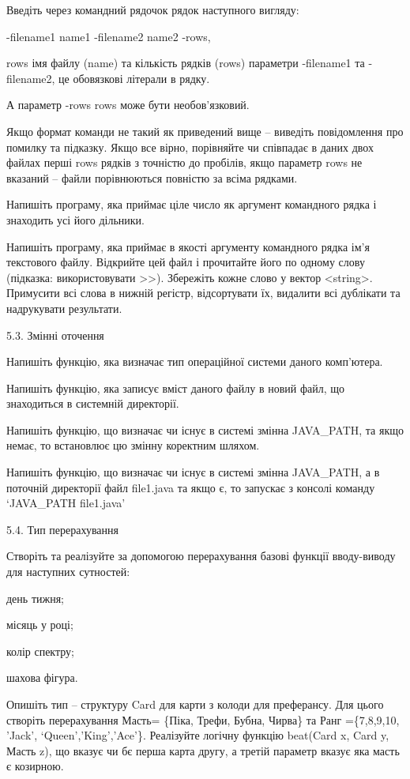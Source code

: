\documentclass[]{article}
\begin{document}
Введіть через командний рядочок рядок наступного вигляду:

-filename1 name1 -filename2 name2 -rows,

rows імя файлу (name) та кількість рядків (rows) параметри -filename1 та
-filename2, це обовязкові літерали в рядку.

А параметр -rows rows може бути необов'язковий.

Якщо формат команди не такий як приведений вище -- виведіть повідомлення
про помилку та підказку. Якщо все вірно, порівняйте чи співпадає в даних
двох файлах перші rows рядків з точністю до пробілів, якщо параметр rows
не вказаний -- файли порівнюються повністю за всіма рядками.

Напишіть програму, яка приймає ціле число як аргумент командного рядка і
знаходить усі його дільники.

Напишіть програму, яка приймає в якості аргументу командного рядка ім'я
текстового файлу. Відкрийте цей файл і прочитайте його по одному слову
(підказка: використовувати \textgreater{}\textgreater{}). Збережіть
кожне слово у вектор \textless{}string\textgreater{}. Примусити всі
слова в нижній регістр, відсортувати їх, видалити всі дублікати та
надрукувати результати.

5.3. Змінні оточення

Напишіть функцію, яка визначає тип операційної системи даного
комп'ютера.

Напишіть функцію, яка записує вміст даного файлу в новий файл, що
знаходиться в системній директорії.

Напишіть функцію, що визначає чи існує в системі змінна JAVA\_PATH, та
якщо немає, то встановлює цю змінну коректним шляхом.

Напишіть функцію, що визначає чи існує в системі змінна JAVA\_PATH, а в
поточній директорії файл file1.java та якщо є, то запускає з консолі
команду `JAVA\_PATH file1.java'

5.4. Тип перерахування

Створіть та реалізуйте за допомогою перерахування базові функції
вводу-виводу для наступних сутностей:

день тижня;

місяць у році;

колір спектру;

шахова фігура.

Опишіть тип -- структуру Card для карти з колоди для преферансу. Для
цього створіть перерахування Масть= \{Піка, Трефи, Бубна, Чирва\} та
Ранг =\{7,8,9,10, 'Jack', `Queen','King','Ace'\}. Реалізуйте логічну
функцію beat(Card x, Card y, Масть z), що вказує чи бє перша карта
другу, а третій параметр вказує яка масть є козирною.
\end{document}

